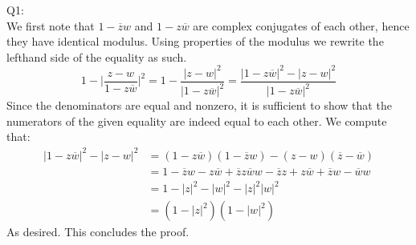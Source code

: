 \documentclass[letterpaper]{article}
\newcommand{\ol}{\overline}
\begin{document}
\noindent
Q1: \newline \\ 
We first note that $1-\ol{z}w$ and $1-z\ol{w}$ are complex conjugates of each other, hence they have identical modulus. Using properties of the modulus we rewrite the lefthand side of the equality as such. 
$$1- \Big|\frac{z-w}{1-z\ol{w}} \Big|^2 = 1- \frac{|z-w|^2}{|1-z\ol{w}|^2} = \frac{|1-z\ol{w} |^2 - |z-w|^2}{|1 -z \ol{w} |^2}$$
Since the denominators are equal and nonzero, it is sufficient to show that the numerators of the given equality are indeed equal to each other. We compute that:
\begin{align*}
|1 - z\ol{w}|^2 - |z-w|^2 & = (1-z \ol{w})(1- \ol{z}w) - (z-w)(\ol{z} -\ol{w})
\\ & = 1 - \ol{z}w - z\ol{w} + \ol{z}z\ol{w}w- \ol{z}z + z\ol{w} + \ol{z}w - \ol{w}w
\\ & = 1 - |z|^2 - |w|^2 - |z|^2|w|^2
\\ & = (1-|z|^2)(1-|w|^2)
\end{align*} 
As desired. This concludes the proof. 
\end{document}

